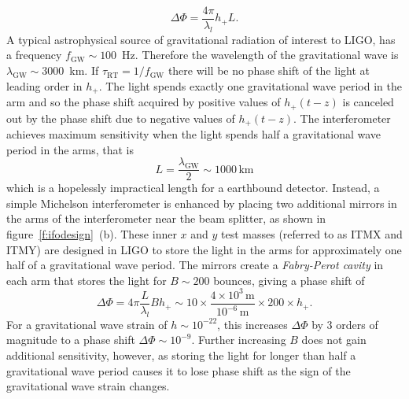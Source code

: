 \begin{equation}
\Delta \Phi = \frac{4\pi}{\lambda_l} h_{+} L.
\end{equation}
A typical astrophysical source of gravitational radiation of interest to LIGO,
has a frequency $f_\mathrm{GW} \sim 100$~Hz. Therefore the wavelength of the
gravitational wave is $\lambda_\mathrm{GW} \sim 3000$~km. If
$\tau_\mathrm{RT} = 1 / f_\mathrm{GW}$ there will be no phase shift of the
light at leading order in $h_+$. The light spends exactly one gravitational
wave period in the arm and so the phase shift acquired by positive values of
$h_+(t-z)$ is canceled out by the phase shift due to negative values of
$h_+(t-z)$. The interferometer achieves maximum sensitivity when the light
spends half a gravitational wave period in the arms, that is
\begin{equation}
L = \frac{\lambda_\mathrm{GW}}{2} \sim 1000\,\mathrm{km}
\end{equation}
which is a hopelessly impractical length for a earthbound detector. Instead,
a simple Michelson interferometer is enhanced by placing two additional
mirrors in the arms of the interferometer near the beam splitter, as shown in
figure~\ref{f:ifodesign}~(b). These inner $x$ and $y$ test masses (referred to
as ITMX and ITMY) are designed in LIGO to store the light in the arms for
approximately one half of a gravitational wave period.  The mirrors create a
\emph{Fabry-Perot cavity} in each arm that stores the light for $B \sim 200$
bounces, giving a phase shift of
\begin{equation}
\Delta \Phi = 4\pi \frac{L}{\lambda_l} B h_{+} \sim 
10 \times \frac{4 \times 10^3\,\mathrm{m}}{10^{-6}\,\mathrm{m}} 
\times 200 \times h_+.
\end{equation}
For a gravitational wave strain of $h \sim 10^{-22}$, this increases
$\Delta\Phi$ by 3 orders of magnitude to a phase shift $\Delta \Phi \sim
10^{-9}$.  Further increasing $B$ does not gain additional sensitivity,
however, as storing the light for longer than half a gravitational wave period
causes it to lose phase shift as the sign of the gravitational wave strain
changes.

